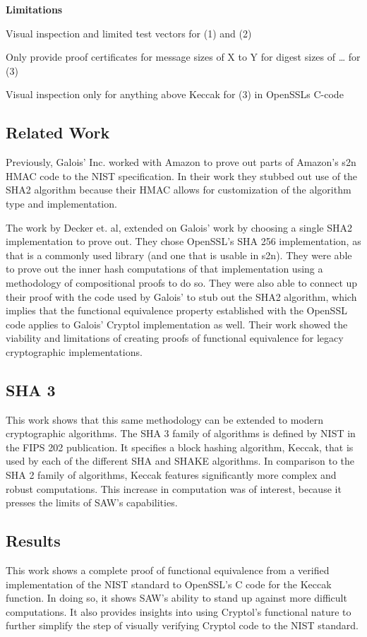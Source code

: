 \noindent \textbf{Limitations}
\begin{compactitem}
  \item Visual inspection and limited test vectors for (1) and (2)
  \item Only provide proof certificates for message sizes of X to Y for digest sizes of … for (3)
  \item Visual inspection only for anything above Keccak for (3) in OpenSSLs C-code
\end{compactitem}

\subsection{Related Work}
  Previously, Galois’ Inc. worked with Amazon to prove out parts of Amazon’s s2n HMAC code to the NIST specification.  
In their work they stubbed out use of the SHA2 algorithm because their HMAC allows for customization of the algorithm type and implementation.

The work by Decker et. al, extended on Galois' work by choosing a single SHA2 implementation to prove out.  
They chose OpenSSL’s SHA 256 implementation, as that is a commonly used library (and one that is usable in s2n).  
They were able to prove out the inner hash computations of that implementation using a methodology of compositional proofs to do so.  
They were also able to connect up their proof with the code used by Galois’ to stub out the SHA2 algorithm, which implies that the functional equivalence property established with the OpenSSL code applies to Galois' Cryptol implementation as well.  
Their work showed the viability and limitations of creating proofs of functional equivalence for legacy cryptographic implementations.

\subsection{SHA 3}
This work shows that this same methodology can be extended to modern cryptographic algorithms.
The SHA 3 family of algorithms is defined by NIST in the FIPS 202 publication.
It specifies a block hashing algorithm, Keccak, that is used by each of the different SHA and SHAKE algorithms.
In comparison to the SHA 2 family of algorithms, Keccak features significantly more complex and robust computations.
This increase in computation was of interest, because it presses the limits of SAW's capabilities.

\subsection{Results}
This work shows a complete proof of functional equivalence from a verified implementation of the NIST standard to OpenSSL's C code for the Keccak function.
In doing so, it shows SAW's ability to stand up against more difficult computations.
It also provides insights into using Cryptol's functional nature to further simplify the step of visually verifying Cryptol code to the NIST standard.